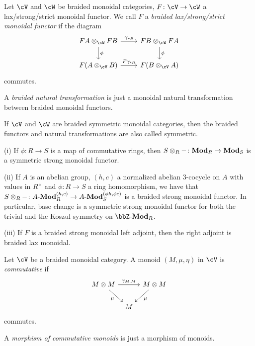 \documentclass[a4paper,11pt,oneside,openany]{scrbook}
\begin{document}
\begin{defn}
    Let $\cV$ and $\cW$ be braided monoidal categories, $F\colon\cV\rightarrow\cW$ a lax/strong/strict monoidal functor. We call $F$ a \emph{braided lax/strong/strict monoidal functor} if the diagram
    \[
    \begin{tikzcd}
        FA\otimes_\cW FB\ar[r, "\gamma_\cW"]\ar[d, "\phi"]
        & FB\otimes_\cW FA\ar[d, "\phi"] \\
        F(A\otimes_\cV B)\ar[r, "F\gamma_\cV"]
        & F(B\otimes_\cV A)
    \end{tikzcd}
    \]
    commutes.
    
    A \emph{braided natural transformation} is just a monoidal natural transformation between braided monoidal functors.
    
    If $\cV$ and $\cW$ are braided symmetric monoidal categories, then the braided functors and natural transformations are also called symmetric.
\end{defn}

\begin{exmp}
\item[(i)] If $\phi\colon R\rightarrow S$ is a map of commutative rings, then $S\otimes_R-\colon{\normalfont\textbf{Mod}}_R\rightarrow{\normalfont\textbf{Mod}}_S$ is a symmetric strong monoidal functor.

\item[(ii)] If $A$ is an abelian group, $(h,c)$ a normalized abelian 3-cocycle on $A$ with values in $R^\times$ and $\phi\colon R\rightarrow S$ a ring homomorphism, we have that $S\otimes_R-\colon A\text{-}{\normalfont\textbf{Mod}}_R^{(h,c)}\rightarrow A\text{-}{\normalfont\textbf{Mod}}_S^{(\phi h,\phi c)}$ is a braided strong monoidal functor. In particular, base change is a symmetric strong monoidal functor for both the trivial and the Koszul symmetry on $\bbZ\text{-}\Mod_R$.

\item[(iii)] If $F$ is a braided strong monoidal left adjoint, then the right adjoint is braided lax monoidal.
\end{exmp}

\begin{defn}
    Let $\cV$ be a braided monoidal category. A monoid $(M,\mu,\eta)$ in $\cV$ is \emph{commutative} if
    \[
    \begin{tikzcd}[column sep=tiny]
        M\otimes M\ar[rr, "\gamma_{M,M}"]\ar[dr, swap, "\mu"]
        && M\otimes M\ar[dl, "\mu"] \\
        & M
    \end{tikzcd}
    \]
    commutes.
    
    A \emph{morphism of commutative monoids} is just a morphism of monoids.
\end{defn}
\end{document}
